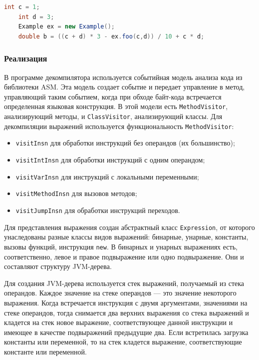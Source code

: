 \begin{lstlisting}[label=decompiled-example,caption = Пример кода выражения в JVM без переходов, frame = single, language = JAVA]
	int c = 1; 
	int d = 3; 
	Example ex = new Example();
	double b = ((c + d) * 3 - ex.foo(c,d)) / 10 + c * d; 
\end{lstlisting} 

\subsubsection*{Реализация}
В программе декомпилятора используется событийная модель анализа кода из библиотеки ASM. Эта модель создает событие и передает управление в метод, управляющий таким событием, когда при обходе байт-кода встречается определенная языковая конструкция. В этой модели есть \texttt{MethodVisitor}, анализирующий методы, и \texttt{ClassVisitor}, анализирующий классы. Для декомпиляции выражений используется функциональность \texttt{MethodVisitor}:
\begin{itemize}
\item \texttt{visitInsn} для обработки инструкций без операндов (их большинство);
\item \texttt{visitIntInsn} для обработки инструкций с одним операндом;
\item \texttt{visitVarInsn} для инструкций с локальными переменными;
\item \texttt{visitMethodInsn} для вызовов методов;
\item \texttt{visitJumpInsn} для обработки инструкций переходов.
\end{itemize}

Для представления выражения создан абстрактный класс \texttt{Expression}, от которого унаследованы разные классы видов выражений: бинарные, унарные, константы, вызовы функций, инструкция \texttt{new}. В бинарных и унарных выражениях есть, соответственно, левое и правое подвыражение или одно подвыражение. Они и составляют структуру JVM-дерева.

Для создания JVM-дерева используется стек выражений, получаемый из стека операндов. Каждое значение на стеке операндов --- это значение некоторого выражения. Когда встречается инструкция с двумя аргументами, значениями на стеке операндов, тогда снимается два верхних выражения со стека выражений и кладется на стек новое выражение, соответствующее данной инструкции и имеющее в качестве подвыражений предыдущие два. Если встретилась загрузка константы или переменной, то на стек кладется выражение, соответствующие константе или переменной. 

